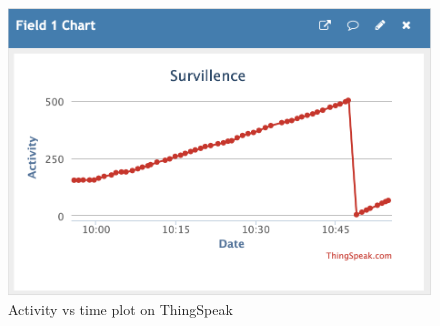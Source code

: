 \documentclass[12pt, a4paper]{article}
\theoremstyle{definition}
\theoremstyle{remark}
\begin{document}
\begin{figure}[!t]
    \centering
    \includegraphics[scale=0.6]{img/ThingSpeak Chart.png}
    \caption{Activity vs time plot on ThingSpeak}
    \label{fig:TS}
\end{figure}
\end{document}
